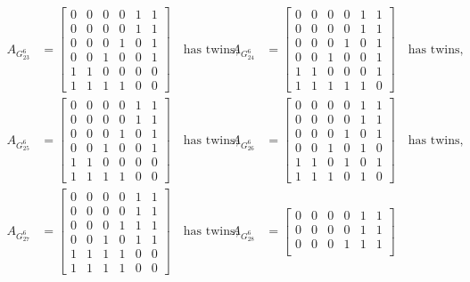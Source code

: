 \documentclass[11pt,reqno]{amsart}
\begin{document}
\begin{align*}
\\
A_{\scriptscriptstyle G_{23}^6}&=\begin{bmatrix}
0&0&0&0&1&1\\
0&0&0&0&1&1\\
0&0&0&1&0&1\\
0&0&1&0&0&1\\
1&1&0&0&0&0\\
1&1&1&1&0&0
\end{bmatrix}\quad\text{has twins},
&A_{\scriptscriptstyle G_{24}^6}&=\begin{bmatrix}
0&0&0&0&1&1\\
0&0&0&0&1&1\\
0&0&0&1&0&1\\
0&0&1&0&0&1\\
1&1&0&0&0&1\\
1&1&1&1&1&0
\end{bmatrix}\quad\text{has twins},
\\
A_{\scriptscriptstyle G_{25}^6}&=\begin{bmatrix}
0&0&0&0&1&1\\
0&0&0&0&1&1\\
0&0&0&1&0&1\\
0&0&1&0&0&1\\
1&1&0&0&0&0\\
1&1&1&1&0&0
\end{bmatrix}\quad\text{has twins},
&A_{\scriptscriptstyle G_{26}^6}&=\begin{bmatrix}
0&0&0&0&1&1\\
0&0&0&0&1&1\\
0&0&0&1&0&1\\
0&0&1&0&1&0\\
1&1&0&1&0&1\\
1&1&1&0&1&0
\end{bmatrix}\quad\text{has twins},
\\
A_{\scriptscriptstyle G_{27}^6}&=\begin{bmatrix}
0&0&0&0&1&1\\
0&0&0&0&1&1\\
0&0&0&1&1&1\\
0&0&1&0&1&1\\
1&1&1&1&0&0\\
1&1&1&1&0&0
\end{bmatrix}\quad\text{has twins},
&A_{\scriptscriptstyle G_{28}^6}&=\begin{bmatrix}
0&0&0&0&1&1\\
0&0&0&0&1&1\\
0&0&0&1&1&1\\

\end{bmatrix}
\end{align*}
\end{document}
